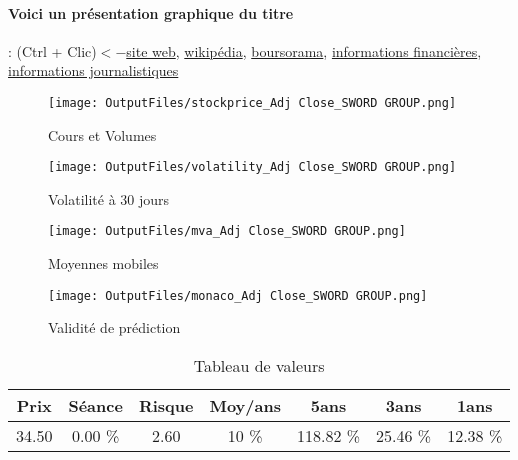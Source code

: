 \documentclass[11pt,a4paper]{report}%
\begin{document}
\paragraph{Voici un présentation graphique du titre} : (Ctrl + Clic)$<-$\href{https://www.sword-group.com/}{site web}, \href{https://fr.wikipedia.org/wiki/Sword_Group}{wikipédia}, \href{https://www.boursorama.com/cours/1rPSWP}{boursorama}, \href{https://www.qwant.com/?q=site:https:%2f%2fwww.easybourse.com%2faction-societe%2fSWORD-GROUP&t=web&client=ext-firefox-hp}{informations financières}, \href{https://bourse.lerevenu.com/cours-de-bourse/fiche-valeur-synthese/SWORD-GROUP/SWP-FR}{informations journalistiques}
\begin{figure}[!htb]
   \begin{minipage}{0.5\textwidth}
     \centering
     \texttt{[image: OutputFiles/stockprice\_Adj Close\_SWORD GROUP.png]}
     \caption{Cours et Volumes}\label{Fig:price_SWORD GROUP}
   \end{minipage}\hfill
   \begin{minipage}{0.5\textwidth}
     \centering
     \texttt{[image: OutputFiles/volatility\_Adj Close\_SWORD GROUP.png]}
     \caption{Volatilité à 30 jours}\label{Fig:volat_SWORD GROUP}
   \end{minipage}
\end{figure}
\begin{figure}[!htb]
   \begin{minipage}{0.5\textwidth}
     \centering
     \texttt{[image: OutputFiles/mva\_Adj Close\_SWORD GROUP.png]}
     \caption{Moyennes mobiles}\label{Fig:mva_SWORD GROUP}
   \end{minipage}\hfill
   \begin{minipage}{0.5\textwidth}
     \centering
     \texttt{[image: OutputFiles/monaco\_Adj Close\_SWORD GROUP.png]}
     \caption{Validité de prédiction}\label{Fig:prediction_SWORD GROUP}
   \end{minipage}
\end{figure}

\begin{table}[H]
  \centering
    \begin{tabular}{|c|c|c|c|c|c|c|}
    \hline
    Prix & Séance & Risque  & Moy/ans & 5ans & 3ans & 1ans \\
    \hline
    34.50 &    0.00 \%    & 2.60 & 10 \% & 118.82 \% & 25.46 \% & 12.38 \% \\
    \hline
    \end{tabular}%
        \label{tab:table_SWORD GROUP}%
      \caption{Tableau de valeurs}
\end{table}%
\end{document}

